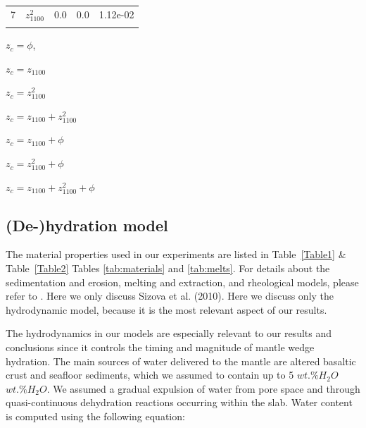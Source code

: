 \documentclass[draft,linenumbers]{agujournal2018} %
\providecommand{\DIFaddtex}[1]{{\protect\color{blue} \sf #1}} %
\providecommand{\DIFdeltex}[1]{{\protect\color{red} \scriptsize #1}} %
\providecommand{\DIFaddbegin}{} %
\providecommand{\DIFaddend}{} %
\providecommand{\DIFdelbegin}{} %
\providecommand{\DIFdelend}{} %
\providecommand{\DIFaddFL}[1]{\DIFadd{#1}} %
\providecommand{\DIFadd}[1]{\texorpdfstring{\DIFaddtex{#1}}{#1}} %
\providecommand{\DIFdel}[1]{\texorpdfstring{\DIFdeltex{#1}}{}} %
\newcommand{\DIFscaledelfig}{0.3}
\newlength{\DIFdelgraphicswidth} %
\newlength{\DIFdelgraphicsheight} %
\newcommand{\DIFaddincludegraphics}[2][]{{\color{blue}\fbox{\DIFOincludegraphics[#1]{#2}}}} %
\newcommand{\DIFdelincludegraphics}[2][]{%
\sbox{\DIFdelgraphicsbox}{\DIFOincludegraphics[#1]{#2}}%
\settoboxwidth{\DIFdelgraphicswidth}{\DIFdelgraphicsbox} %
\settoboxtotalheight{\DIFdelgraphicsheight}{\DIFdelgraphicsbox} %
\scalebox{\DIFscaledelfig}{%
\parbox[b]{\DIFdelgraphicswidth}{\usebox{\DIFdelgraphicsbox}\\[-\baselineskip] \rule{\DIFdelgraphicswidth}{0em}}\llap{\resizebox{\DIFdelgraphicswidth}{\DIFdelgraphicsheight}{%
\setlength{\unitlength}{\DIFdelgraphicswidth}%
\begin{picture}(1,1)%
\thicklines\linethickness{2pt} %
{\color[rgb]{1,0,0}\put(0,0){\framebox(1,1){}}}%
{\color[rgb]{1,0,0}\put(0,0){\line( 1,1){1}}}%
{\color[rgb]{1,0,0}\put(0,1){\line(1,-1){1}}}%
\end{picture}%
}\hspace*{3pt}}} %
} %
\DeclareRobustCommand{\DIFaddbegin}{\DIFOaddbegin \let\includegraphics\DIFaddincludegraphics} %
\DeclareRobustCommand{\DIFaddend}{\DIFOaddend \let\includegraphics\DIFOincludegraphics} %
\DeclareRobustCommand{\DIFdelbegin}{\DIFOdelbegin \let\includegraphics\DIFdelincludegraphics} %
\DeclareRobustCommand{\DIFdelend}{\DIFOaddend \let\includegraphics\DIFOincludegraphics} %
\begin{document}
\begin{table}
\begin{threeparttable}
\begin{tabular}[t]{llrrl}
7 & $z_{1100}^2$ & 0.0 & 0.0 & 1.12e-02\\
\cellcolor{gray!6}{7} & \cellcolor{gray!6}{$\phi$} & \cellcolor{gray!6}{-0.1} & \cellcolor{gray!6}{0.0} & \cellcolor{gray!6}{7.28e-04}\\
\bottomrule
\end{tabular}
\begin{tablenotes}
\item[\DIFaddFL{1}] $z_c=\phi$,
\item[\DIFaddFL{2}] $z_c=z_{1100}$
\item[\DIFaddFL{3}] $z_c=z_{1100}^2$
\item[\DIFaddFL{4}] $z_c=z_{1100}+z_{1100}^2$
\item[\DIFaddFL{5}] $z_c=z_{1100}+\phi$
\item[\DIFaddFL{6}] $z_c=z_{1100}^2+\phi$
\item[\DIFaddFL{7}] $z_c=z_{1100}+z_{1100}^2+\phi$
\end{tablenotes}
\end{threeparttable}
\end{table}

\clearpage

\subsection{\DIFadd{(De-)hydration model}}

\DIFaddend The material properties used in our experiments are listed in \DIFdelbegin \DIFdel{Table~\ref{Table1} \& Table~\ref{Table2}}\DIFdelend \DIFaddbegin \DIFadd{Tables
\ref{tab:materials} and \ref{tab:melts}}\DIFaddend . For details about the
sedimentation and erosion, melting and extraction, and rheological
models, please refer to \DIFdelbegin %
\DIFdel{. Here we only discuss }\DIFdelend \DIFaddbegin \DIFadd{Sizova et al. (2010). Here we discuss only }\DIFaddend the
hydrodynamic model, because it is the most relevant aspect of our
results.

The hydrodynamics in our models \DIFdelbegin \DIFdel{are especially relevant to our results and conclusions since it }\DIFdelend controls the timing and magnitude of
mantle wedge hydration. The main sources of water delivered to the
mantle are altered basaltic crust and seafloor sediments, which we
assumed \DIFaddbegin \DIFadd{to }\DIFaddend contain up to 5 \DIFdelbegin \DIFdel{$wt.\% H_2O$}\DIFdelend \DIFaddbegin \DIFadd{\(wt.\% H_{2}O\)}\DIFaddend . We assumed a gradual
expulsion of water from pore space and through quasi-continuous
dehydration reactions occurring within the slab. Water content is
computed using the following equation:
\end{document}
